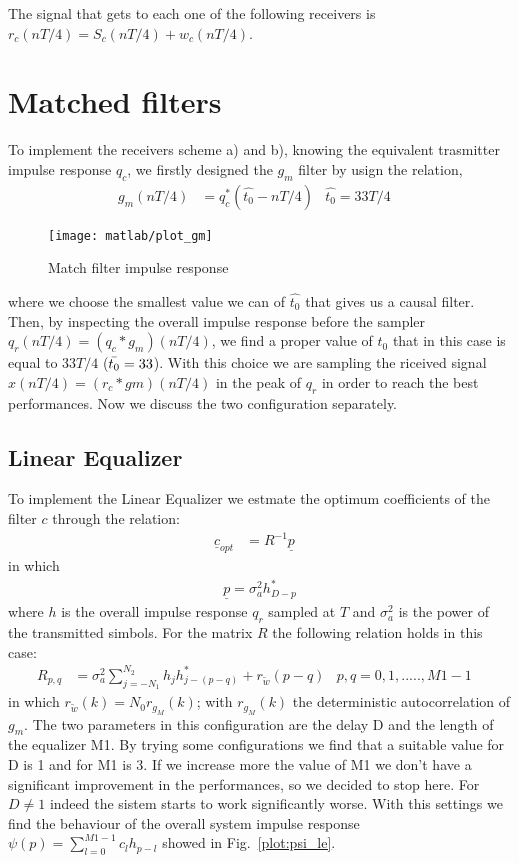 \documentclass[a4paper,oneside]{article}
\renewcommand{\vec}[1]{\underline{#1}}
\begin{document}
The signal that gets to each one of the following receivers is
$r_c(nT/4) = S_c(nT/4) + w_c(nT/4)$.

\section{Matched filters}
\label{sec:mf}
To implement the receivers scheme a) and b), knowing the equivalent trasmitter impulse response $q_c$, we firstly designed the $g_m$ filter by usign the relation, 
\begin{align}
  g_m(n T/4) &= q_c^* (\hat{t_0}-n T/4) & \hat{t_0} = 33 T/4&
\end{align}

\begin{figure}[htbp]
  \centering
  \texttt{[image: matlab/plot\_gm]}
  \caption{Match filter impulse response}
  \label{plot:gm}
\end{figure}

where we choose the smallest value we can of $\hat{t_0}$ that gives us a causal filter. 
Then, by inspecting the overall impulse response before the sampler $q_r(n T/4) = (q_c * g_m)(n T/4)$, we find a proper value of $t_0$ that in this case is equal to $33T/4$ ($\Bar{t_0} = 33$). With this choice we are sampling the riceived signal $x(nT/4) = (r_c*gm)(nT/4)$ in the peak of $q_r$ in order to reach the best performances.
Now we discuss the two configuration separately.
\subsection{Linear Equalizer}
\label{sec:le}
To implement the Linear Equalizer we estmate the optimum coefficients of the filter $c$ through the relation:
\begin{align}
\vec{c}_{opt}& = R^{-1} \vec{p}&
\label{eq:c_opt}  
\end{align} 
in which 
\begin{align}
&\vec{p} = \sigma_a^2 h_{D-p}^*&
\label{eq:p}  
\end{align}
where $h$ is the overall impulse response $q_r$ sampled at $T$ and $\sigma_a^2$ is the power of the transmitted simbols. For the matrix $R$ the following relation holds in this case:
\begin{align}
 R_{p,q} &= \sigma^2_a \sum_{j=-N_1}^{N_2}h_jh^*_{j-(p-q)} + r_{\tilde{w}}(p-q) & p,q = 0,1,.....,M1-1&
  \label{eq:R_le}
\end{align}
in which $r_{\tilde{w}}(k) = N_0 r_{g_M}(k)$; with $r_{g_M}(k)$ the deterministic autocorrelation of $g_m$.
The two parameters in this configuration are the delay D and the length of the  equalizer M1. By trying some configurations we find that a suitable value for D is 1 and for M1 is 3. If we increase more the value of M1 we don't have a significant improvement in the performances, so we decided to stop here. For $D\neq 1$ indeed the sistem starts to work significantly worse. With this settings we find the behaviour of the overall system impulse response $\psi(p) = \sum_{l=0}^{M1-1} c_l h_{p-l}$ showed in Fig.~\ref{plot:psi_le}. 
\end{document}
